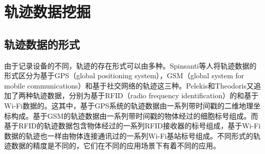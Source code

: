 \section{轨迹数据挖掘}


\subsection{轨迹数据的形式}
由于记录设备的不同，轨迹的存在形式可以由多种。Spinsanti等人将轨迹数据的形式区分为基于GPS（global positioning system），GSM（global system for mobile communications）和基于社交网络的轨迹这三种。Pelekis和Theodoris又追加了两种轨迹数据，分别为基于RFID（radio frequency identification）的和基于Wi-Fi数据的。这其中，基于GPS系统的轨迹数据由一系列带时间戳的二维地理坐标构成。基于GSM的轨迹数据由一系列带时间戳的物体经过的细胞标号组成。而基于RFID的轨迹数据包含物体经过的一系列RFID接收器的标号组成，基于Wi-Fi数据的轨迹也一样由物体连接通讯过的一系列Wi-Fi基站标号组成。不同形式的轨迹数据的精度是不同的，它们在不同的应用场景下有着不同的应用。

